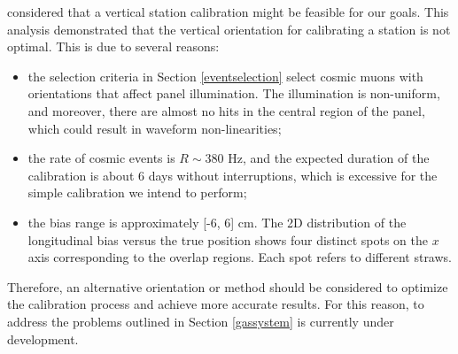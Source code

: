 {  considered that a vertical station calibration might be feasible for our goals.
This analysis demonstrated that the vertical orientation for calibrating a station is not optimal. This is due to several reasons:
\begin{itemize}
    \item the selection criteria in Section \ref{eventselection} select cosmic muons with orientations that affect panel illumination. 
    The illumination is non-uniform, and moreover, there are almost no hits in the central region of the panel, which could result in waveform non-linearities;
    \item the rate of cosmic events is $R \sim 380$ Hz, and the expected duration of the calibration is about 6 days without interruptions, 
    which is excessive for the simple calibration we intend to perform;
    \item the bias range is approximately [-6, 6] cm. The 2D distribution of the longitudinal bias versus the true position shows 
    four distinct spots on the $x$ axis corresponding to the overlap regions. Each spot refers to different straws.
\end{itemize}
Therefore, an alternative orientation or method should be considered to optimize the calibration process and achieve more accurate results.
For this reason, 
%
to address the problems outlined in Section \ref{gassystem}  
is currently under development.






}
